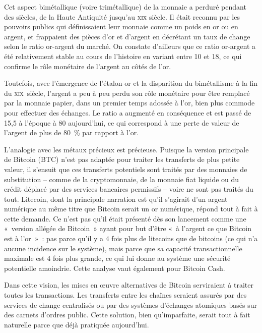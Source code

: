 Cet aspect bimétallique (voire trimétallique) de la monnaie a perduré pendant des siècles, de la Haute Antiquité jusqu'au \textsc{xix}\ieme{} siècle. Il était reconnu par les pouvoirs publics qui définissaient leur monnaie comme un poids en or ou en argent, et frappaient des pièces d'or et d'argent en décrétant un taux de change selon le ratio or-argent du marché. On constate d'ailleurs que ce ratio or-argent a été relativement stable au cours de l'histoire en variant entre 10 et 18, ce qui confirme le rôle monétaire de l'argent au côtés de l'or.

Toutefois, avec l'émergence de l'étalon-or et la disparition du bimétallisme à la fin du \textsc{xix}\ieme{}~siècle, l'argent a peu à peu perdu son rôle monétaire pour être remplacé par la monnaie papier, dans un premier temps adossée à l'or, bien plus commode pour effectuer des échanges. Le ratio a augmenté en conséquence et est passé de 15,5 à l'époque à 80 aujourd'hui, ce qui correspond à une perte de valeur de l'argent de plus de 80~\% par rapport à l'or.

L'analogie avec les métaux précieux est précieuse. Puisque la version principale de Bitcoin (BTC) n'est pas adaptée pour traiter les transferts de plus petite valeur, il s'ensuit que ces transferts potentiels sont traités par des monnaies de substitution -- comme de la cryptomonnaie, de la monnaie fiat liquide ou du crédit déplacé par des services bancaires permissifs -- voire ne sont pas traités du tout. Litecoin, dont la principale narration est qu'il s'agirait d'un argent numérique au même titre que Bitcoin serait un or numérique, répond tout à fait à cette demande. Ce n'est pas qu'il était présenté dès son lancement comme une «~version allégée de Bitcoin~» ayant pour but d'être «~à l'argent ce que Bitcoin est à l'or~»~: pas parce qu'il y a 4 fois plus de litecoins que de bitcoins (ce qui n'a aucune incidence sur le système), mais parce que sa capacité transactionnelle maximale est 4 fois plus grande, ce qui lui donne au système une sécurité potentielle amoindrie. Cette analyse vaut également pour Bitcoin Cash.

Dans cette vision, les mises en œuvre alternatives de Bitcoin serviraient à traiter toutes les transactions. Les transferts entre les chaînes seraient assurés par des services de change centralisés ou par des systèmes d'échanges atomiques basés sur des carnets d'ordres public. Cette solution, bien qu'imparfaite, serait tout à fait naturelle parce que déjà pratiquée aujourd'hui.

